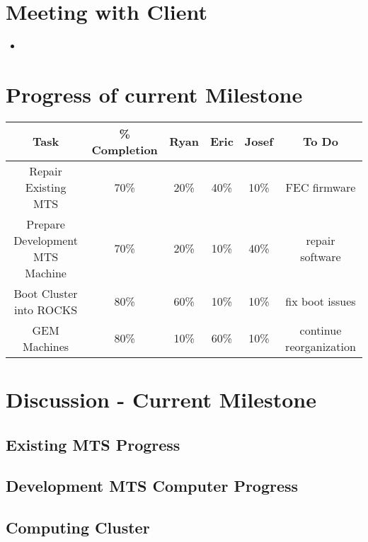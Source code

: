 \documentclass[12pt]{article}
\begin{document}
\section{Meeting with Client}

\begin{itemize}
\item 
\end{itemize}

\section{Progress of current Milestone}

\begin{adjustwidth}{-2cm}{}
  \begin{center}
    \begin{tabular}{|c|c|c|c|c|c|}
      \hline
      Task & \% Completion & Ryan & Eric & Josef & To Do \\
      \hline
      Repair Existing MTS & 70\% & 20\% & 40\% & 10\% & FEC firmware \\
      Prepare Development MTS Machine & 70\% & 20\% & 10\% & 40\% & repair
                                                                    software \\
      Boot Cluster into ROCKS & 80\% & 60\% & 10\% & 10\% & fix boot issues \\
      GEM Machines & 80\% & 10\% & 60\% & 10\% & continue reorganization \\
      \hline   
    \end{tabular}
  \end{center}
\end{adjustwidth}

\section{Discussion - Current Milestone}

\subsection{Existing MTS Progress}



\subsection{Development MTS Computer Progress}



\subsection{Computing Cluster}
\end{document}
